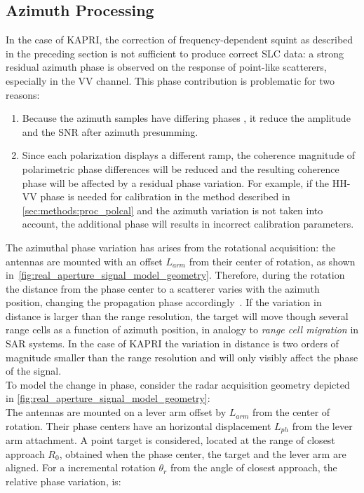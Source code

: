 \subsection{Azimuth Processing}\label{sec:methods:azimuth_processing}
In the case of KAPRI, the correction of frequency-dependent squint as described in the preceding section is not sufficient to produce correct SLC data: a strong residual  azimuth phase is observed on the response of point-like scatterers, especially in the VV channel. This phase contribution is problematic for two reasons:
\begin{enumerate}
	\item Because the azimuth samples have differing phases
	, it reduce the amplitude and the SNR after azimuth presumming. 
  \item Since each polarization displays a different ramp, the coherence magnitude of polarimetric phase differences will be reduced and the resulting coherence phase will be affected by a residual phase variation. For example, if the HH-VV phase is needed for calibration in the method described in \autoref{sec:methods:proc_polcal} and the azimuth variation is not taken into account, the additional phase will results in incorrect calibration parameters.\label{item:phase_variation}
\end{enumerate}
The azimuthal phase variation has arises from the rotational acquisition: the antennas are mounted with an offset $L_{arm}$  from their center of rotation, as shown in~\autoref{fig:real_aperture_signal_model_geometry}. Therefore, during the rotation the distance from the phase center to a scatterer varies with the azimuth position, changing the propagation phase accordingly~\cite{Lee2014}. If the variation in distance is  larger than the range resolution, the target will move though several range cells as a function of azimuth position, in analogy to \emph{range cell migration} in SAR systems. In the case of KAPRI the variation in distance is two orders of magnitude smaller than the range resolution and will only visibly affect the phase of the signal.\\
To model the change in phase, consider the radar acquisition geometry depicted in \autoref{fig:real_aperture_signal_model_geometry}:\\
The antennas are mounted on a lever arm offset by $L_{arm}$ from the center of rotation.
Their phase centers have an horizontal displacement $L_{ph}$ from the lever arm attachment.
A point target is considered, located at the  range of closest approach $R_0$, obtained when the phase center, the target and the lever arm are aligned. For a incremental rotation  $\theta_r$ from the angle of closest approach, the relative phase variation, is:
